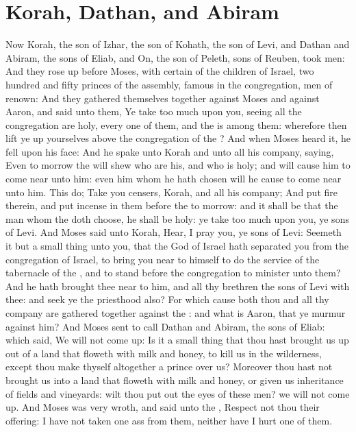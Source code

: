 \section*{Korah, Dathan, and Abiram}
\begin{biblechapter} %
\verse Now Korah, the son of Izhar, the son of Kohath, the son of Levi, and Dathan and Abiram, the sons of Eliab, and On, the son of Peleth, sons of Reuben, took men:
\verse And they rose up before Moses, with certain of the children of Israel, two hundred and fifty princes of the assembly, famous in the congregation, men of renown:
\verse And they gathered themselves together against Moses and against Aaron, and said unto them, Ye take too much upon you, seeing all the congregation are holy, every one of them, and the \LORD is among them: wherefore then lift ye up yourselves above the congregation of the \LORD?
\verse And when Moses heard it, he fell upon his face:
\verse And he spake unto Korah and unto all his company, saying, Even to morrow the \LORD will shew who are his, and who is holy; and will cause him to come near unto him: even him whom he hath chosen will he cause to come near unto him.
\verse This do; Take you censers, Korah, and all his company;
\verse And put fire therein, and put incense in them before the \LORD to morrow: and it shall be that the man whom the \LORD doth choose, he shall be holy: ye take too much upon you, ye sons of Levi.
\verse And Moses said unto Korah, Hear, I pray you, ye sons of Levi:
\verse Seemeth it but a small thing unto you, that the God of Israel hath separated you from the congregation of Israel, to bring you near to himself to do the service of the tabernacle of the \LORD, and to stand before the congregation to minister unto them?
\verse And he hath brought thee near to him, and all thy brethren the sons of Levi with thee: and seek ye the priesthood also?
\verse For which cause both thou and all thy company are gathered together against the \LORD: and what is Aaron, that ye murmur against him?
\verse And Moses sent to call Dathan and Abiram, the sons of Eliab: which said, We will not come up:
\verse Is it a small thing that thou hast brought us up out of a land that floweth with milk and honey, to kill us in the wilderness, except thou make thyself altogether a prince over us?
\verse Moreover thou hast not brought us into a land that floweth with milk and honey, or given us inheritance of fields and vineyards: wilt thou put out the eyes of these men? we will not come up.
\verse And Moses was very wroth, and said unto the \LORD, Respect not thou their offering: I have not taken one ass from them, neither have I hurt one of them.

\end{biblechapter}

